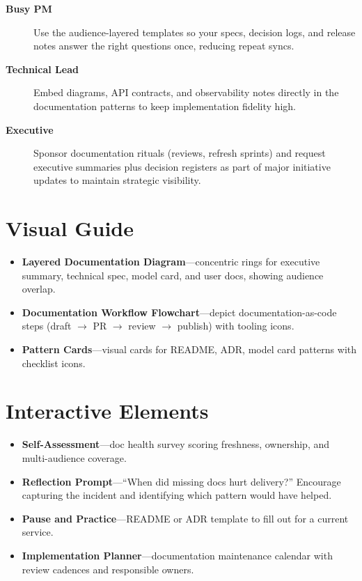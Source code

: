 \begin{description}
    \item[\textbf{Busy PM}] Use the audience-layered templates so your specs, decision logs, and release notes answer the right questions once, reducing repeat syncs.
    \item[\textbf{Technical Lead}] Embed diagrams, API contracts, and observability notes directly in the documentation patterns to keep implementation fidelity high.
    \item[\textbf{Executive}] Sponsor documentation rituals (reviews, refresh sprints) and request executive summaries plus decision registers as part of major initiative updates to maintain strategic visibility.
\end{description}
\section{Visual Guide}
\label{sec:docs-visuals}
\begin{itemize}
    \item \textbf{Layered Documentation Diagram}—concentric rings for executive summary, technical spec, model card, and user docs, showing audience overlap.
    \item \textbf{Documentation Workflow Flowchart}—depict documentation-as-code steps (draft $\rightarrow$ PR $\rightarrow$ review $\rightarrow$ publish) with tooling icons.
    \item \textbf{Pattern Cards}—visual cards for README, ADR, model card patterns with checklist icons.
\end{itemize}

\section{Interactive Elements}
\label{sec:docs-interactive}
\begin{itemize}
    \item \textbf{Self-Assessment}—doc health survey scoring freshness, ownership, and multi-audience coverage.
    \item \textbf{Reflection Prompt}—``When did missing docs hurt delivery?'' Encourage capturing the incident and identifying which pattern would have helped.
    \item \textbf{Pause and Practice}—README or ADR template to fill out for a current service.
    \item \textbf{Implementation Planner}—documentation maintenance calendar with review cadences and responsible owners.
\end{itemize}

